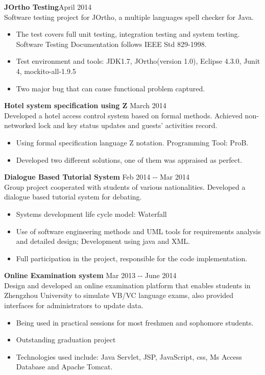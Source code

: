 \documentclass[margin]{res}
\begin{document}
\begin{resume}
{\bf JOrtho Testing}\hfill April 2014\\
Software testing project for JOrtho, a multiple languages spell checker for
Java.
\begin{itemize}
  \item The test covers full
unit testing, integration testing and system testing. Software Testing
Documentation follows IEEE Std 829-1998. 
\item Test environment and tools: JDK1.7, JOrtho(version 1.0), Eclipse 4.3.0,
Junit 4, mockito-all-1.9.5
\item Two major bug that can cause functional problem captured.
\end{itemize}
{\bf Hotel system specification using Z} \hfill March 2014\\
Developed a hotel access control system based on formal methods.
Achieved non-networked lock and key status updates and guests'
activities record.
\begin{itemize}
   \item Using formal specification language Z notation. Programming Tool: ProB. 
   \item Developed two different solutions, one of them was appraised as
   perfect.
 \end{itemize}
{\bf Dialogue Based Tutorial System} \hfill Feb 2014 -­‐ Mar 2014\\
Group project cooperated with students of various nationalities. Developed a
dialogue based tutorial system for debating.
\begin{itemize}
  \item Systems development life cycle model: Waterfall
  \item Use of software engineering methods and UML tools for requirements
  analysis and detailed design; Development using java and XML.
  \item Full participation in the project, responsible for the code implementation.
\end{itemize}
{\bf Online Examination system} \hfill Mar 2013 -­‐ June 2014\\
Design and developed an online examination platform that enables students in
Zhengzhou University to simulate VB/VC language exams, also provided interfaces
for administrators to update data. 
\begin{itemize} 
  \item Being used in practical sessions for most
freshmen and sophomore students.
  \item Outstanding graduation project
  \item Technologies used
include: Java Servlet, JSP, JavaScript, css, Ms Access Database and Apache
Tomcat.
\end{itemize}


\end{resume}
\end{document}
